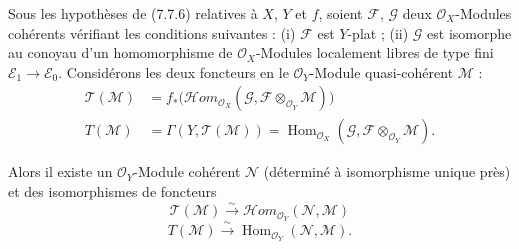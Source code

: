 \begin{corollary}[7.7.8]
Sous les hypothèses de \textup{(7.7.6)} relatives à $X$, $Y$ et $f$, soient $\mathscr F$,
$\mathscr G$ deux $\mathscr O_X$-Modules cohérents vérifiant les conditions
suivantes : \textup{(i)} $\mathscr F$ est $Y$-plat ; \textup{(ii)} $\mathscr G$ est isomorphe au
conoyau d'un homomorphisme de $\mathscr O_X$-Modules localement libres de type
fini $\mathscr E_1\to\mathscr E_0$. Considérons les deux foncteurs en le
$\mathscr O_Y$-Module quasi-cohérent $\mathscr M$ :
\begin{align*}
  \mathscr T(\mathscr M)
  &=
  f_*
  \bigl(
    \mathscr{H}\!om_{\mathscr O_X}
      (\mathscr G,\mathscr F\otimes_{\mathscr O_Y}\mathscr M)
  \bigr)\\
  T(\mathscr M)
  &=
  \Gamma(Y,\mathscr T(\mathscr M))
  =
  \operatorname{Hom}_{\mathscr O_X}
    (\mathscr G,\mathscr F\otimes_{\mathscr O_Y}\mathscr M).
\end{align*}

Alors il existe un $\mathscr O_Y$-Module cohérent $\mathscr N$ (déterminé à
isomorphisme unique près) et des isomorphismes de foncteurs
\[
  \mathscr T(\mathscr M)
  \xrightarrow{\sim}
  \mathscr{H}\!om_{\mathscr O_Y}(\mathscr N,\mathscr M)
  \tag{7.7.8.1}\label{III.7.7.8.1.fr}
\]
\[
  T(\mathscr M)
  \xrightarrow{\sim}
  \operatorname{Hom}_{\mathscr O_Y}(\mathscr N,\mathscr M).
  \tag{7.7.8.2}\label{III.7.7.8.2.fr}
\]
\end{corollary}

